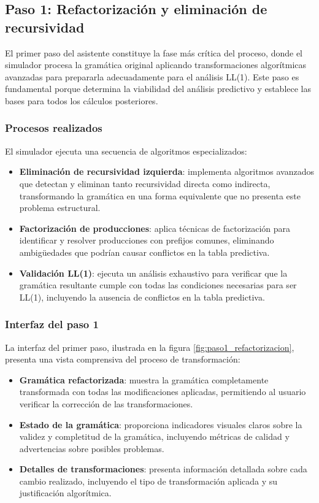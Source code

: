 \subsection{Paso 1: Refactorización y eliminación de recursividad}

El primer paso del asistente constituye la fase más crítica del proceso, donde el simulador procesa la gramática original aplicando transformaciones algorítmicas avanzadas para prepararla adecuadamente para el análisis LL(1). Este paso es fundamental porque determina la viabilidad del análisis predictivo y establece las bases para todos los cálculos posteriores.

\subsubsection{Procesos realizados}

El simulador ejecuta una secuencia de algoritmos especializados:

\begin{itemize}
    \item \textbf{Eliminación de recursividad izquierda}: implementa algoritmos avanzados que detectan y eliminan tanto recursividad directa como indirecta, transformando la gramática en una forma equivalente que no presenta este problema estructural.
    \item \textbf{Factorización de producciones}: aplica técnicas de factorización para identificar y resolver producciones con prefijos comunes, eliminando ambigüedades que podrían causar conflictos en la tabla predictiva.
    \item \textbf{Validación LL(1)}: ejecuta un análisis exhaustivo para verificar que la gramática resultante cumple con todas las condiciones necesarias para ser LL(1), incluyendo la ausencia de conflictos en la tabla predictiva.
\end{itemize}

\subsubsection{Interfaz del paso 1}

La interfaz del primer paso, ilustrada en la figura \ref{fig:paso1_refactorizacion}, presenta una vista comprensiva del proceso de transformación:

\begin{itemize}
    \item \textbf{Gramática refactorizada}: muestra la gramática completamente transformada con todas las modificaciones aplicadas, permitiendo al usuario verificar la corrección de las transformaciones.
    \item \textbf{Estado de la gramática}: proporciona indicadores visuales claros sobre la validez y completitud de la gramática, incluyendo métricas de calidad y advertencias sobre posibles problemas.
    \item \textbf{Detalles de transformaciones}: presenta información detallada sobre cada cambio realizado, incluyendo el tipo de transformación aplicada y su justificación algorítmica.
\end{itemize}

